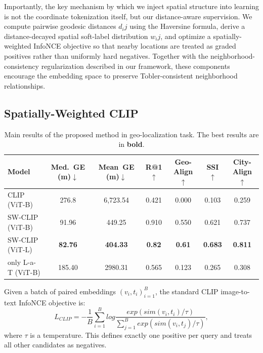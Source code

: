 \documentclass{isprs}
\begin{document}
Importantly, the key mechanism by which we inject spatial structure into learning is not the coordinate tokenization itself, but our distance-aware supervision. We compute pairwise geodesic distances $d_ij$ using the Haversine formula, derive a distance-decayed spatial soft-label distribution $w_ij$, and optimize a spatially-weighted InfoNCE objective so that nearby locations are treated as graded positives rather than uniformly hard negatives. Together with the neighborhood-consistency regularization described in our framework, these components encourage the embedding space to preserve Tobler-consistent neighborhood relationships.

\subsection{Spatially-Weighted CLIP}

\begin{table}[t]
\centering
\small
\setlength{\tabcolsep}{6pt}
\renewcommand{\arraystretch}{1.15}
\caption{Main results of the proposed method in geo-localization task. The best results are in \textbf{bold}.}
\begin{tabular}{lcccccc}
\toprule
\textbf{Model} & \textbf{Med.\ GE (m)$\downarrow$} & \textbf{Mean\ GE (m)$\downarrow$} & \textbf{R@1$\uparrow$} & \textbf{Geo-Align$\uparrow$} & \textbf{SSI$\uparrow$} & \textbf{City-Align$\uparrow$} \\
\midrule
CLIP (ViT-B) & 276.8 & 6,723.54 & 0.421 & 0.000 & 0.103 & 0.259 \\
\midrule
SW-CLIP (ViT-B) & 91.96 & 449.25 & 0.910 & 0.550 & 0.621 & 0.737 \\
SW-CLIP (ViT-L) & \textbf{82.76} & \textbf{404.33} & \textbf{0.82} & \textbf{0.61} & \textbf{0.683} & \textbf{0.811} \\
\midrule
only L-a-T (ViT-B) & 185.40 & 2980.31 & 0.565 & 0.123 & 0.265 & 0.308 \\
\bottomrule
\end{tabular}
\label{tab:main_results}
\end{table}

Given a batch of paired embeddings ${(v_i, t_i)}^{B}_{i=1}$, the standard CLIP image-to-text InfoNCE objective is:
\begin{equation}
    L_{CLIP} = -\frac{1}{B}\sum^{B}_{i=1}log\frac{exp(sim(v_i, t_i)/\tau)}{\sum^{B}_{j=1}exp(sim(v_i, t_j)/\tau)},
\end{equation}
where $\tau$ is a temperature. This defines exactly one positive per query and treats all other candidates as negatives.
\end{document}
